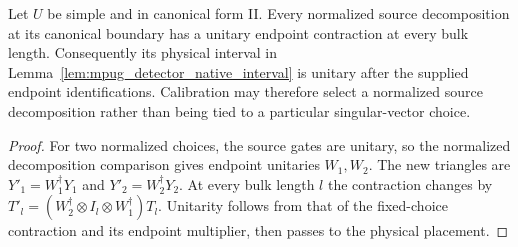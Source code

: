 \begin{lemma}
    \label{lem:mpug_detector_source_choice}
    Let $U$ be simple and in canonical form II. Every normalized source
    decomposition at its canonical boundary has a unitary endpoint
    contraction at every bulk length. Consequently its physical interval
    in Lemma~\ref{lem:mpug_detector_native_interval} is unitary after
    the supplied endpoint identifications. Calibration may therefore
    select a normalized source decomposition rather than being tied to
    a particular singular-vector choice.
\end{lemma}

\begin{proof}
    For two normalized choices, the source gates are unitary, so the
    normalized decomposition comparison gives endpoint unitaries
    $W_1,W_2$. The new triangles are $Y'_1=W_1^{\dagger}Y_1$ and
    $Y'_2=W_2^{\dagger}Y_2$. At every bulk length $l$ the contraction
    changes by $T'_l=(W_2^{\dagger}\otimes I_l\otimes W_1^{\dagger})T_l$.
    Unitarity follows from that of the fixed-choice contraction and its
    endpoint multiplier, then passes to the physical placement.
\end{proof}

